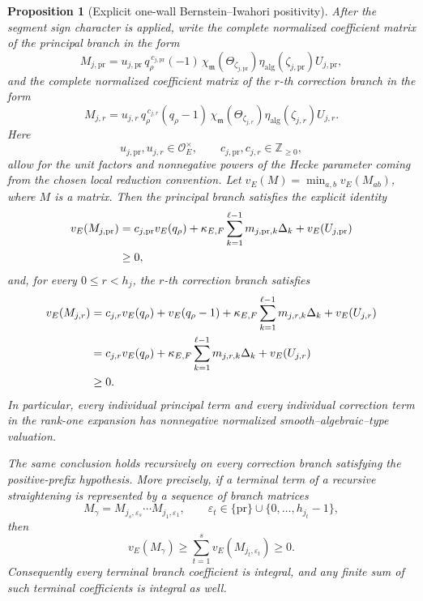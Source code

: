 \documentclass[10pt,a4paper]{amsart}
\newtheorem{proposition}{Proposition}
\newcommand{\Ocoeff}{\mathcal O_E}
\begin{document}
\begin{proposition}[Explicit one-wall Bernstein--Iwahori positivity]
After the segment sign character is applied, write the complete normalized
coefficient matrix of the principal branch in the form
\begin{equation}\label{eq:one-wall-principal-complete-coefficient}
 M_{j,\mathrm{pr}}
 =
 u_{j,\mathrm{pr}}\,
 q_\rho^{\,c_{j,\mathrm{pr}}}
 (-1)\,
 \chi_{\mathfrak m}
 \!\left(\Theta_{\zeta_{j,\mathrm{pr}}}\right)
 \eta_{\mathrm{alg}}
 \!\left(\zeta_{j,\mathrm{pr}}\right)
 U_{j,\mathrm{pr}},
\end{equation}
and the complete normalized coefficient matrix of the \(r\)-th correction
branch in the form
\begin{equation}\label{eq:one-wall-correction-complete-coefficient}
 M_{j,r}
 =
 u_{j,r}\,
 q_\rho^{\,c_{j,r}}
 (q_\rho-1)\,
 \chi_{\mathfrak m}
 \!\left(\Theta_{\zeta_{j,r}}\right)
 \eta_{\mathrm{alg}}
 \!\left(\zeta_{j,r}\right)
 U_{j,r}.
\end{equation}
Here
\[
 u_{j,\mathrm{pr}},u_{j,r}\in\Ocoeff^\times,
 \qquad
 c_{j,\mathrm{pr}},c_{j,r}\in\mathbb Z_{\geq0},
\]
allow for the unit factors and nonnegative powers of the Hecke parameter
coming from the chosen local reduction convention.  Let $v_E(M)=\min_{a,b}v_E(M_{ab})$, where $M$ is a matrix. Then the principal branch satisfies the explicit identity
\begin{align}
 v_E(M_{j,\mathrm{pr}})
 &=
 c_{j,\mathrm{pr}}v_E(q_\rho)
 +
 \kappa_{E,F}
 \sum_{k=1}^{\ell-1}
 m_{j,\mathrm{pr},k}\Delta_k
 +
 v_E(U_{j,\mathrm{pr}})
 \notag\\
 &\geq0,
 \label{eq:one-wall-principal-valuation-nonnegative}
\end{align}
and, for every \(0\leq r<h_j\), the \(r\)-th correction branch satisfies
\begin{align}
 v_E(M_{j,r})
 &=
 c_{j,r}v_E(q_\rho)
 +
 v_E(q_\rho-1)
 +
 \kappa_{E,F}
 \sum_{k=1}^{\ell-1}
 m_{j,r,k}\Delta_k
 +
 v_E(U_{j,r})
 \notag\\
 &=
 c_{j,r}v_E(q_\rho)
 +
 \kappa_{E,F}
 \sum_{k=1}^{\ell-1}
 m_{j,r,k}\Delta_k
 +
 v_E(U_{j,r})
 \notag\\
 &\geq0.
 \label{eq:one-wall-correction-valuation-nonnegative}
\end{align}
In particular, every individual principal term and every individual
correction term in the rank-one expansion has nonnegative normalized
smooth--algebraic--type valuation.

The same conclusion holds recursively on every correction branch satisfying
the positive-prefix hypothesis.  More precisely, if a terminal term of a
recursive straightening is represented by a sequence of branch matrices
\[
 M_{\gamma}
 =
 M_{j_s,\varepsilon_s}\cdots
 M_{j_1,\varepsilon_1},
 \qquad
 \varepsilon_t\in
 \{\mathrm{pr}\}\cup
 \{0,\ldots,h_{j_t}-1\},
\]
then
\begin{equation}\label{eq:one-wall-recursive-product-valuation}
 v_E(M_\gamma)
 \geq
 \sum_{t=1}^s
 v_E(M_{j_t,\varepsilon_t})
 \geq0.
\end{equation}
Consequently every terminal branch coefficient is integral, and any finite
sum of such terminal coefficients is integral as well.
\end{proposition}
\end{document}
